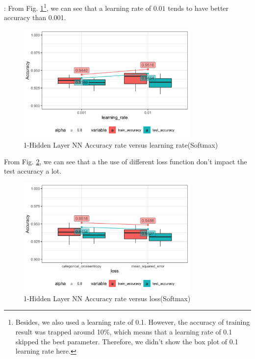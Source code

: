 \documentclass[8pt]{beamer}
\let\oldfootnote\footnote
\renewcommand\footnote[1][]{\oldfootnote[frame,#1]}
\begin{document}
\begin{frame}[allowframebreaks]{\secname : \subsecname}{\subsubsecname}
From Fig. \ref{1-Hidden Layer Neural Network Accuracy rate versus learning rate}\footnote{Besides, we also used a learning rate of 0.1. However, the accuracy of training result was trapped around 10\%, which means that a learning rate of 0.1 skipped the best parameter. Therefore, we didn't show the box plot of 0.1 learning rate here.}, we can see that a learning rate of $0.01$ tends to have better accuracy than 0.001. 
\begin{figure}[htbp]
\centerline{\includegraphics[width=0.8\textwidth]{figure/1-Hidden Layer Neural Network Accuracy rate versus learning_rate.png}}
\caption{1-Hidden Layer NN Accuracy rate versus learning rate(Softmax)}
\label{1-Hidden Layer Neural Network Accuracy rate versus learning rate}
\vspace{-1.5em}
\end{figure}

From Fig. \ref{1-Hidden Layer Neural Network Accuracy rate versus loss}, we can see that a the use of different loss function don't impact the test accuracy a lot.
\begin{figure}[htbp]
\centerline{\includegraphics[width=0.8\textwidth]{figure/1-Hidden Layer Neural Network Accuracy rate versus loss.png}}
\caption{1-Hidden Layer NN Accuracy rate versus loss(Softmax)}
\label{1-Hidden Layer Neural Network Accuracy rate versus loss}
\vspace{-1.5em}
\end{figure}


\end{frame}
\end{document}
